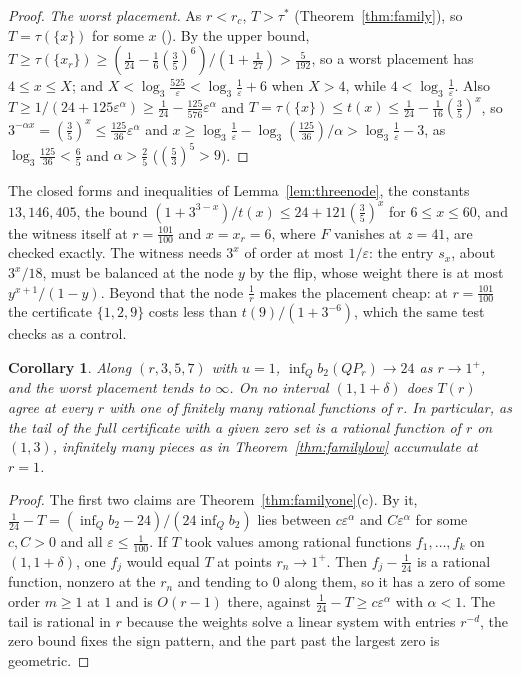 \documentclass[11pt]{article}
\newtheorem{corollary}[theorem]{Corollary}
\begin{document}
\begin{proof}
\emph{The worst placement.}  As $r<r_c$, $T>\tau^*$
(Theorem~\ref{thm:family}), so $T=\tau(\{x\})$ for some $x$
(\cite[Proposition~5.2]{coefficient-mass-attainment}).  By the upper bound,
$T\ge\tau(\{x_r\})\ge(\tfrac1{24}-\tfrac16(\tfrac35)^6)/(1+\tfrac1{27})>\tfrac5{192}$,
so a worst placement has $4\le x\le X$; and $X<\log_3\tfrac{525}\varepsilon<\log_3\tfrac1\varepsilon+6$
when $X>4$, while $4<\log_3\tfrac1\varepsilon$.  Also
$T\ge1/(24+125\varepsilon^\alpha)\ge\tfrac1{24}-\tfrac{125}{576}\varepsilon^\alpha$
and $T=\tau(\{x\})\le t(x)\le\tfrac1{24}-\tfrac1{16}(\tfrac35)^x$, so
$3^{-\alpha x}=(\tfrac35)^x\le\tfrac{125}{36}\varepsilon^\alpha$ and
$x\ge\log_3\tfrac1\varepsilon-\log_3(\tfrac{125}{36})/\alpha>\log_3\tfrac1\varepsilon-3$,
as $\log_3\tfrac{125}{36}<\tfrac65$ and $\alpha>\tfrac25$
($(\tfrac53)^5>9$).
\end{proof}

The closed forms and inequalities of Lemma~\ref{lem:threenode}, the
constants $13,146,405$, the bound $(1+3^{3-x})/t(x)\le24+121(\tfrac35)^x$
for $6\le x\le60$, and the witness itself at $r=\tfrac{101}{100}$ and
$x=x_r=6$, where $F$ vanishes at $z=41$, are checked exactly.  The
witness needs $3^x$ of order at most $1/\varepsilon$: the entry $s_x$,
about $3^x/18$, must be balanced at the node $y$ by the flip, whose weight
there is at most $y^{x+1}/(1-y)$.  Beyond that the node $\tfrac1r$ makes
the placement cheap: at $r=\tfrac{101}{100}$ the certificate $\{1,2,9\}$
costs less than $t(9)/(1+3^{-6})$, which the same test checks as a control.

\begin{corollary}\label{cor:familyone}
Along $(r,3,5,7)$ with $u=1$, $\inf_Qb_2(QP_r)\to24$ as $r\to1^+$, and the
worst placement tends to $\infty$.  On no interval $(1,1+\delta)$ does
$T(r)$ agree at every $r$ with one of finitely many rational functions of
$r$.  In particular, as the tail of the full certificate with a given zero
set is a rational function of $r$ on $(1,3)$, infinitely many pieces as in
Theorem~\ref{thm:familylow} accumulate at $r=1$.
\end{corollary}

\begin{proof}
The first two claims are Theorem~\ref{thm:familyone}(c).  By it,
$\tfrac1{24}-T=(\inf_Qb_2-24)/(24\inf_Qb_2)$ lies between
$c\varepsilon^\alpha$ and $C\varepsilon^\alpha$ for some $c,C>0$ and all
$\varepsilon\le\tfrac1{100}$.  If $T$ took values among rational functions
$f_1,\ldots,f_k$ on $(1,1+\delta)$, one $f_j$ would equal $T$ at points
$r_n\to1^+$.  Then $f_j-\tfrac1{24}$ is a rational function, nonzero at the
$r_n$ and tending to $0$ along them, so it has a zero of some order $m\ge1$
at $1$ and is $O(r-1)$ there, against $\tfrac1{24}-T\ge c\varepsilon^\alpha$
with $\alpha<1$.  The tail is rational in $r$ because the weights solve a
linear system with entries $r^{-d}$, the zero bound fixes the sign pattern,
and the part past the largest zero is geometric.
\end{proof}
\end{document}
